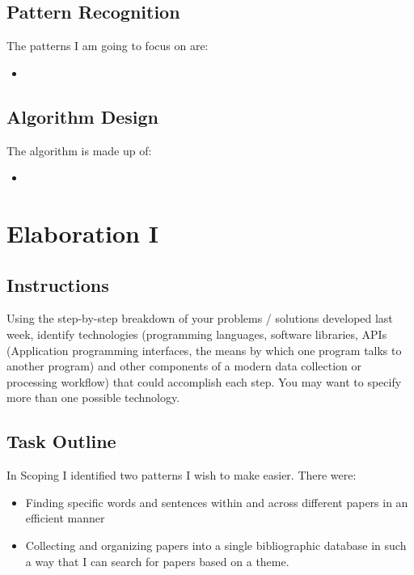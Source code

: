 \documentclass{article}
\begin{document}
\subsection{Pattern Recognition}

The patterns I am going to focus on are:

\begin{itemize}
    \item

\end{itemize}

\subsection{Algorithm Design}

The algorithm is made up of:

\begin{itemize}
    \item

\end{itemize}


\section{Elaboration I}

\subsection{Instructions}

Using the step-by-step breakdown of your problems / solutions developed last week, identify technologies (programming languages, software libraries, APIs (Application programming interfaces, the means by which one program talks to another program) and other components of a modern data collection or processing workflow) that could accomplish each step. You may want to specify more than one possible technology.

\subsection{Task Outline}

\noindent
In Scoping I identified two patterns I wish to make easier. There were:

\begin{itemize}
    \item Finding specific words and sentences within and across different papers in an efficient manner
    \item Collecting and organizing papers into a single bibliographic database in such a way that I can search for papers based on a theme.

\end{itemize}
\end{document}

